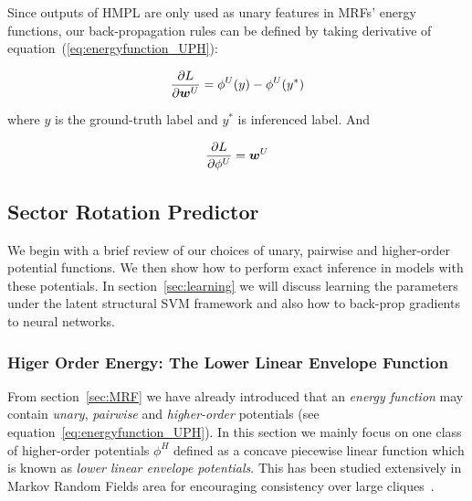 \documentclass[sigconf, anonymous, review]{acmart}
\renewcommand{\cite}{\citep}
\begin{document}
Since outputs of HMPL are only used as unary features in MRFs'
energy functions, our back-propagation rules can be defined by
taking derivative of equation~(\ref{eq:energyfunction_UPH}):

\begin{align}
  \label{eq:der_w}
  \frac{\partial L}{\partial {\boldsymbol{w}}^U} = \phi^U(y)-\phi^U(y^*)
\end{align}

\noindent where $y$ is the ground-truth label and $y^*$ is
inferenced label. And

\begin{align}
  \label{eq:der_phi}
  \frac{\partial L}{\partial \phi^U} = {\boldsymbol{w}}^U
\end{align}


\subsection{Sector Rotation Predictor}
\label{sec:srp}

We begin with a brief review of our choices of unary, pairwise
and higher-order potential functions. We then show how to perform
exact inference in models with these potentials. In
section~\ref{sec:learning} we will discuss learning the
parameters under the latent structural SVM framework and also how
to back-prop gradients to neural networks.


\subsubsection{Higer Order Energy: The Lower Linear Envelope Function}
\label{sec:llep}

From section~\ref{sec:MRF} we have already introduced that an
\emph{energy function} may contain \emph{unary}, \emph{pairwise}
and \emph{higher-order} potentials (see
equation~\eqref{eq:energyfunction_UPH}). In this section we
mainly focus on one class of higher-order potentials $\phi^H$
defined as a concave piecewise linear function which is known as
\emph{lower linear envelope potentials}. This has been studied
extensively in Markov Random Fields area for encouraging
consistency over large
cliques~\cite{Kohli:CVPR07,Nowozin:2011,Gould:ICML2011}.
\end{document}
